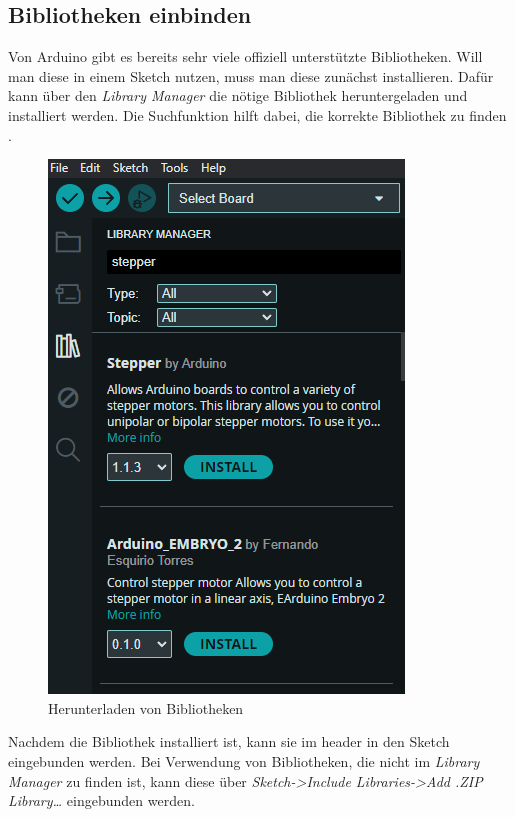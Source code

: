 \subsection{Bibliotheken einbinden}
Von Arduino gibt es bereits sehr viele offiziell unterstützte Bibliotheken. Will man diese in einem Sketch nutzen, muss man diese zunächst installieren.
Dafür kann über den \textit{Library Manager} die nötige Bibliothek heruntergeladen und installiert werden. Die Suchfunktion hilft dabei, die korrekte Bibliothek zu finden \cite{Arduino.2024c}.
\begin{figure}
	\begin{center}
		\includegraphics[width=\textwidth]{General/Librarymanager}
		\caption{Herunterladen von Bibliotheken} \label{Herunterladen von Bibliotheken}
	\end{center}
\end{figure}
Nachdem die Bibliothek installiert ist, kann sie im header in den Sketch eingebunden werden.
Bei Verwendung von Bibliotheken, die nicht im \textit{Library Manager} zu finden ist, kann diese über \textit{Sketch->Include Libraries->Add .ZIP Library…} eingebunden werden.

